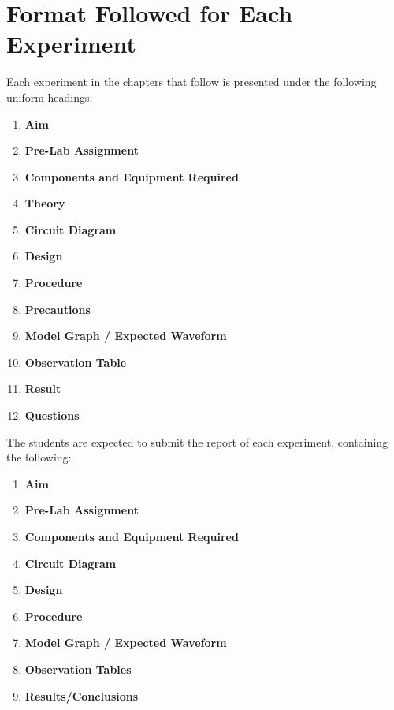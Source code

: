 \section*{Format Followed for Each Experiment}
Each experiment in the chapters that follow is presented under the following uniform headings:
\begin{enumerate}[label=\arabic*.]
	\item \textbf{Aim}
	\item \textbf{Pre-Lab Assignment}
	\item \textbf{Components and Equipment Required}
	\item \textbf{Theory}
	\item \textbf{Circuit Diagram}
	\item \textbf{Design}
	\item \textbf{Procedure}
	\item \textbf{Precautions}
	\item \textbf{Model Graph / Expected Waveform}
	\item \textbf{Observation Table}
	\item \textbf{Result}
	\item \textbf{Questions}
\end{enumerate}
The students are expected to submit the report of each experiment, containing the following:
\begin{enumerate}[label=\arabic*.]
	\item \textbf{Aim}
	\item \textbf{Pre-Lab Assignment}
	\item \textbf{Components and Equipment Required}
	\item \textbf{Circuit Diagram}
	\item \textbf{Design}
	\item \textbf{Procedure}
	\item \textbf{Model Graph / Expected Waveform}
	\item \textbf{Observation Tables}
	\item \textbf{Results/Conclusions}
\end{enumerate}